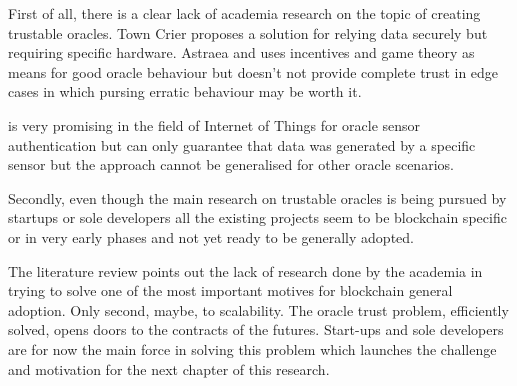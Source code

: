 First of all, there is a clear lack of academia research on the topic of creating trustable oracles. Town Crier proposes a solution for relying data securely but requiring specific hardware. Astraea and \cite{MontotoMonroy2018BitcoinBlockchain} uses incentives and game theory as means for good oracle behaviour but doesn't not provide complete trust in edge cases in which pursing erratic behaviour may be worth it.

\cite{Eberhardt2018Off-chainingComputations} is very promising in the field of Internet of Things for oracle sensor authentication but can only guarantee that data was generated by a specific sensor but the approach cannot be generalised for other oracle scenarios.

Secondly, even though the main research on trustable oracles is being pursued by startups or sole developers all the existing projects seem to be blockchain specific or in very early phases and not yet ready to be generally adopted.

The literature review points out the lack of research done by the academia in trying to solve one of the most important motives for blockchain general adoption. Only second, maybe, to scalability. The oracle trust problem, efficiently solved, opens doors to the contracts of the futures. Start-ups and sole developers are for now the main force in solving this problem which launches the challenge and motivation for the next chapter of this research.
